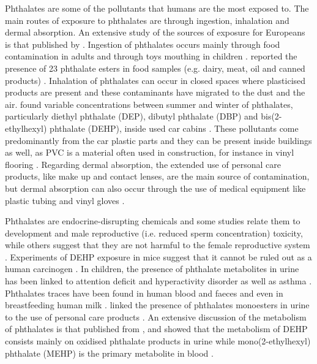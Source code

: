 Phthalates are some of the pollutants that humans are the most exposed to.
%
The main routes of exposure to phthalates are through ingestion, inhalation and dermal absorption.
%
An extensive study of the  sources of exposure  for Europeans is that published by  \citeauthor{wormuth2006sources} \cite{wormuth2006sources}.
%
Ingestion of phthalates occurs mainly through food contamination in adults and through toys mouthing in children \cite{fan2012determination,earls2003gas}. 
%
 \citeauthor{xu2014determination} reported the presence of 23 phthalate esters in food samples (e.g. dairy, meat, oil and canned products) 
\cite{xu2014determination}.
%
Inhalation of phthalates  can occur in closed spaces where plasticised products are present and these contaminants  have migrated to the dust and the air.
%
\citeauthor{geiss2009investigation} found  variable concentrations between summer and winter of phthalates, particularly diethyl phthalate (DEP), dibutyl phthalate (DBP) and bis(2-ethylhexyl) phthalate (DEHP), inside used car cabins \cite{geiss2009investigation}.
%
These pollutants come predominantly from the car plastic parts and they can be present inside buildings as well, as PVC is a material often used in construction, for instance in vinyl flooring  \cite{gong2018letter}.
%
%
Regarding dermal absorption, the extended use of personal care products, like make up and contact lenses, are the main source of contamination, but dermal absorption can also occur through the use of medical equipment like plastic tubing and vinyl gloves \cite{perez2011presence,duty2005personal,calafat2004exposure}.



Phthalates are  %
endocrine-disrupting chemicals  %
and some studies relate them to development and male reproductive  (i.e. reduced sperm concentration) toxicity, while others suggest that they are not harmful to the female reproductive system \cite{rudel2003phthalates,foster2000effects,benson2009hazard,matsumoto2008potential,kay2013reproductive}. 
%
Experiments of  DEHP exposure  in mice suggest that it cannot be ruled out as a human carcinogen \cite{rusyn2012mechanistic}.
%
In children, the presence of phthalate metabolites in urine has been linked to attention deficit and hyperactivity disorder as well as  asthma \cite{kim2009phthalates,bornehag2010phthalate}.
%
Phthalates traces have been found in human blood and faeces and even in breastfeeding human milk \cite{de2014review,zhu2006phthalate}.
%
\citeauthor{duty2005personal} linked the presence of phthalates monoesters in urine to the use of personal care products \cite{duty2005personal}.
%
An extensive discussion of the metabolism of phthalates is that published from \citeauthor{frederiksen2007metabolism}, %
and  
\citeauthor{wittassek2008phthalates} showed that the metabolism of DEHP consists mainly on oxidised phthalate products in urine while mono(2-ethylhexyl) phthalate (MEHP) is the primary metabolite in blood 
\cite{frederiksen2007metabolism,wittassek2008phthalates}.
%


